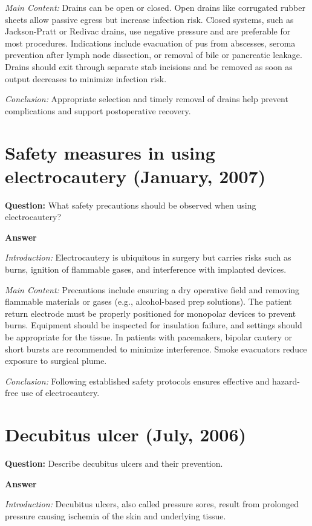 \documentclass{article}
\begin{document}
\emph{Main Content:} Drains can be open or closed. Open drains like corrugated rubber sheets allow passive egress but increase infection risk. Closed systems, such as Jackson-Pratt or Redivac drains, use negative pressure and are preferable for most procedures. Indications include evacuation of pus from abscesses, seroma prevention after lymph node dissection, or removal of bile or pancreatic leakage. Drains should exit through separate stab incisions and be removed as soon as output decreases to minimize infection risk.

\emph{Conclusion:} Appropriate selection and timely removal of drains help prevent complications and support postoperative recovery.


\section{Safety measures in using electrocautery (January, 2007)}


\textbf{Question:} What safety precautions should be observed when using electrocautery?

\textbf{Answer}

\emph{Introduction:} Electrocautery is ubiquitous in surgery but carries risks such as burns, ignition of flammable gases, and interference with implanted devices.

\emph{Main Content:} Precautions include ensuring a dry operative field and removing flammable materials or gases (e.g., alcohol-based prep solutions). The patient return electrode must be properly positioned for monopolar devices to prevent burns. Equipment should be inspected for insulation failure, and settings should be appropriate for the tissue. In patients with pacemakers, bipolar cautery or short bursts are recommended to minimize interference. Smoke evacuators reduce exposure to surgical plume.

\emph{Conclusion:} Following established safety protocols ensures effective and hazard-free use of electrocautery.


\section{Decubitus ulcer (July, 2006)}


\textbf{Question:} Describe decubitus ulcers and their prevention.

\textbf{Answer}

\emph{Introduction:} Decubitus ulcers, also called pressure sores, result from prolonged pressure causing ischemia of the skin and underlying tissue.
\end{document}
